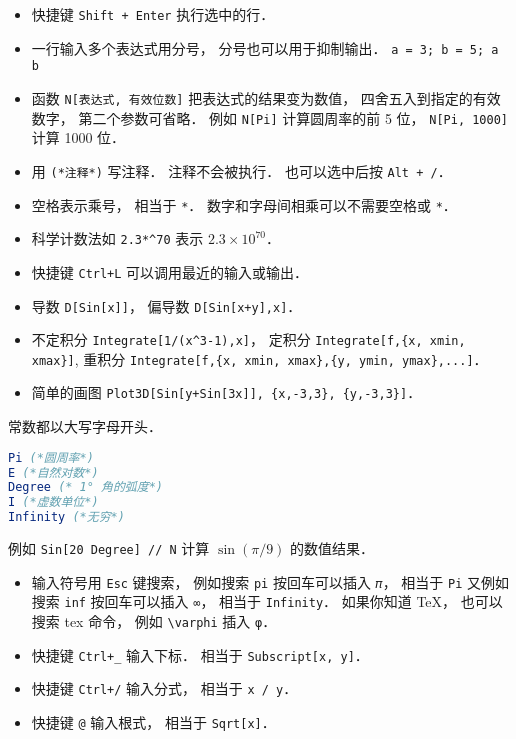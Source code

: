 
\begin{issues}
\issueDraft
\end{issues}


\begin{itemize}
\item 快捷键 \verb|Shift + Enter| 执行选中的行．
\item 一行输入多个表达式用分号， 分号也可以用于抑制输出． \verb|a = 3; b = 5; a b|
\item 函数 \verb|N[表达式, 有效位数]| 把表达式的结果变为数值， 四舍五入到指定的有效数字， 第二个参数可省略． 例如 \verb|N[Pi]| 计算圆周率的前 5 位， \verb|N[Pi, 1000]| 计算 1000 位．
\item 用 \verb|(*注释*)| 写注释． 注释不会被执行． 也可以选中后按 \verb|Alt + /|．
\item 空格表示乘号， 相当于 \verb|*|． 数字和字母间相乘可以不需要空格或 \verb|*|．
\item 科学计数法如 \verb|2.3*^70| 表示 $2.3\times 10^{70}$．
\item 快捷键 \verb|Ctrl+L| 可以调用最近的输入或输出．
\item 导数 \verb|D[Sin[x]]|， 偏导数 \verb|D[Sin[x+y],x]|．
\item 不定积分 \verb|Integrate[1/(x^3-1),x]|， 定积分 \verb|Integrate[f,{x, xmin, xmax}]|, 重积分 \verb|Integrate[f,{x, xmin, xmax},{y, ymin, ymax},...]|．
\item 简单的画图 \verb|Plot3D[Sin[y+Sin[3x]], {x,-3,3}, {y,-3,3}]|．
\end{itemize}

常数都以大写字母开头．
\begin{lstlisting}[language=Mathematica]
Pi (*圆周率*)
E (*自然对数*)
Degree (* 1° 角的弧度*)
I (*虚数单位*)
Infinity (*无穷*)
\end{lstlisting}
例如 \verb|Sin[20 Degree] // N| 计算 $\sin(\pi/9)$ 的数值结果．

\begin{itemize}
\item 输入符号用 \verb|Esc| 键搜索， 例如搜索 \verb|pi| 按回车可以插入 \verb|𝜋|， 相当于 \verb|Pi| 又例如搜索 \verb|inf| 按回车可以插入 \verb|∞|， 相当于 \verb|Infinity|． 如果你知道 TeX， 也可以搜索 tex 命令， 例如 \verb|\varphi| 插入 \verb|φ|．
\item 快捷键 \verb|Ctrl+_| 输入下标． 相当于 \verb|Subscript[x, y]|．
\item 快捷键 \verb|Ctrl+/| 输入分式， 相当于 \verb|x / y|．
\item 快捷键 \verb|@| 输入根式， 相当于 \verb|Sqrt[x]|．
\end{itemize}


